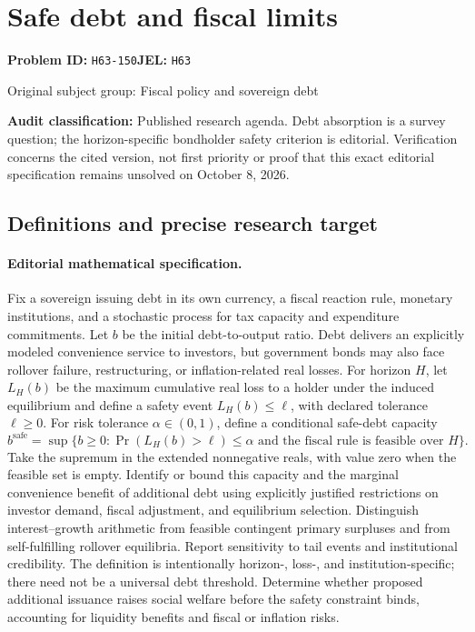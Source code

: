\documentclass[11pt,a4paper]{article}
\begin{document}
\section*{Safe debt and fiscal limits}
\textbf{Problem ID:} \texttt{H63-150}\quad \textbf{JEL:} \texttt{H63}\par
\label{problem:OP-0254}
{\sffamily\small\color{muted}Original subject group: Fiscal policy and sovereign debt\par}
\label{definitions:problem:30007535}
\textbf{Audit classification:} Published research agenda. Debt absorption is a survey question; the horizon-specific bondholder safety criterion is editorial. Verification concerns the cited version, not first priority or proof that this exact editorial specification remains unsolved on October 8, 2026.
\subsection*{Definitions and precise research target}
\paragraph{Editorial mathematical specification.} Fix a sovereign issuing debt in its own currency, a fiscal reaction rule, monetary institutions, and a stochastic process for tax capacity and expenditure commitments. Let \(b\) be the initial debt-to-output ratio. Debt delivers an explicitly modeled convenience service to investors, but government bonds may also face rollover failure, restructuring, or inflation-related real losses. For horizon \(H\), let \(L_H(b)\) be the maximum cumulative real loss to a holder under the induced equilibrium and define a safety event \(L_H(b)\le\ell\), with declared tolerance \(\ell\ge0\).
For risk tolerance \(\alpha\in(0,1)\), define a conditional safe-debt capacity
\[
b^{\mathrm{safe}}=
\sup\{b\ge0:\Pr(L_H(b)>\ell)\le\alpha
\text{ and the fiscal rule is feasible over }H\}.
\]
Take the supremum in the extended nonnegative reals, with value zero when the feasible set is empty. Identify or bound this capacity and the marginal convenience benefit of additional debt using explicitly justified restrictions on investor demand, fiscal adjustment, and equilibrium selection. Distinguish interest–growth arithmetic from feasible contingent primary surpluses and from self-fulfilling rollover equilibria. Report sensitivity to tail events and institutional credibility. The definition is intentionally horizon-, loss-, and institution-specific; there need not be a universal debt threshold. Determine whether proposed additional issuance raises social welfare before the safety constraint binds, accounting for liquidity benefits and fiscal or inflation risks.
\end{document}
